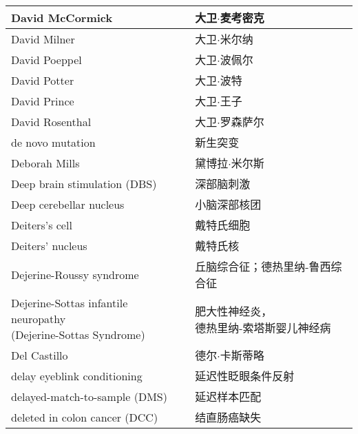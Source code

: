 \begin{longtable}{lll}
	\midrule
	David McCormick     &&  大卫$\cdot$麦考密克  \\
	
	\midrule
	David Milner     &&  大卫$\cdot$米尔纳  \\
	
	\midrule
	David Poeppel     &&  大卫$\cdot$波佩尔  \\
	
	\midrule
	David Potter     &&  大卫$\cdot$波特  \\
	
	\midrule
	David Prince     &&  大卫$\cdot$王子  \\
	
	\midrule
	David Rosenthal     &&  大卫$\cdot$罗森萨尔  \\
	
	\midrule
	de novo mutation     &&  新生突变  \\
	
	\midrule
	Deborah Mills     &&  黛博拉$\cdot$米尔斯  \\
	
	\midrule
	Deep brain stimulation (DBS)     &&  深部脑刺激  \\
	
	\midrule
	Deep cerebellar nucleus   &&  小脑深部核团  \\
	
	\midrule
	Deiters's cell   &&  戴特氏细胞  \\
	
	\midrule
	Deiters' nucleus   &&  戴特氏核  \\
	
	\midrule
	Dejerine-Roussy syndrome   &&  丘脑综合征；德热里纳-鲁西综合征  \\
	
	\midrule
	\makecell[l]{Dejerine-Sottas infantile neuropathy \\ (Dejerine-Sottas Syndrome)}  &&  \makecell{肥大性神经炎，\\德热里纳-索塔斯婴儿神经病}  \\
	
	\midrule
	Del Castillo   &&  德尔$\cdot$卡斯蒂略  \\
	
	\midrule
	delay eyeblink conditioning   &&  延迟性眨眼条件反射  \\
	
	\midrule
	delayed-match-to-sample  (DMS)   &&  延迟样本匹配  \\
	
	\midrule
	deleted in colon cancer (DCC)     &&  结直肠癌缺失  \\
	

\end{longtable}
